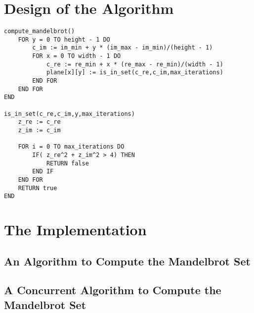 \section{Design of the Algorithm}

\begin{lstlisting}[label = li:mandelalgo, caption = A sequential algorithm to compute the Mandelbrot Set presented in pseudo code.]
compute_mandelbrot()
    FOR y = 0 TO height - 1 DO
        c_im := im_min + y * (im_max - im_min)/(height - 1)
        FOR x = 0 TO width - 1 DO
            c_re := re_min + x * (re_max - re_min)/(width - 1)
            plane[x][y] := is_in_set(c_re,c_im,max_iterations)
        END FOR
    END FOR
END

is_in_set(c_re,c_im,y,max_iterations)
    z_re := c_re
    z_im := c_im

    FOR i = 0 TO max_iterations DO
        IF( z_re^2 + z_im^2 > 4) THEN
            RETURN false
        END IF
    END FOR
    RETURN true 
END

\end{lstlisting}

\section{The Implementation}

\subsection{An Algorithm to Compute the Mandelbrot Set}


\subsection{A Concurrent Algorithm to Compute the Mandelbrot Set}

